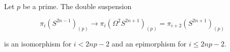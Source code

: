 Let $p$ be a prime. The double suspension

$$\pi_i(S^{2n-1})_{(p)} \rightarrow \pi_i(\Omega^2 S^{2n+1})_{(p)} = \pi_{i+2}(S^{2n+1})_{(p)}$$

is an isomorphism for $i < 2np - 2$ and an epimorphism for $i \leq 2np - 2$.
